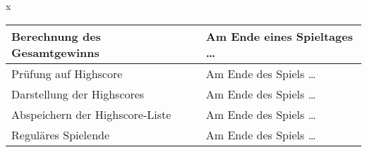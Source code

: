 \documentclass[a4paper]{article}
\begin{document}
\begin{exercise}{x}
\begin{center}
\begin{tabular}{| p{2.5cm} | p{2.2cm} | p{10cm} |}
		Berechnung des Gesamtgewinns &
		& Am Ende eines Spieltages \dots \\ \hline
		
		Pr\"ufung auf Highscore &
		& Am Ende des Spiels \dots \\ \hline

		Darstellung der Highscores &
		& Am Ende des Spiels \dots\\ \hline
				
		Abspeichern der Highscore-Liste &
		& Am Ende des Spiels \dots \\ \hline
		
		Regul\"ares Spielende &
		& Am Ende des Spiels \dots \\ \hline
		
	\end{tabular}
\end{center}

\end{exercise}


\end{document}
